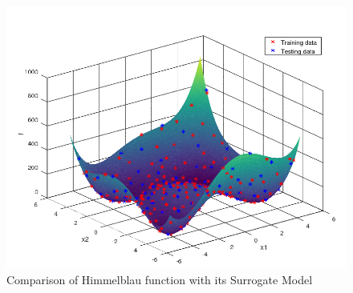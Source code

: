 \begin{figure}[H]
	\includegraphics[width=\textwidth]{optimization/Himmel_blau_fcn.png}
	\caption{Comparison of Himmelblau function with its Surrogate Model}
	\label{fig:Comparison of Himmelblau function with its Surrogate Model} %
\end{figure}






